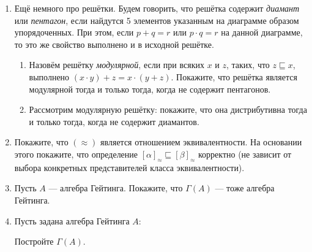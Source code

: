 \documentclass[10pt,a4paper,oneside]{article}
\begin{document}
\begin{enumerate}
\item Ещё немного про решётки. Будем говорить, что решётка содержит \emph{диамант} или \emph{пентагон},
если найдутся 5 элементов указанным на диаграмме образом упорядоченных.
При этом, если $p + q = r$ или $p \cdot q = r$ на данной диаграмме, то это же свойство выполнено 
и в исходной решётке.

\begin{center}\end{center}
\begin{enumerate}

\item Назовём решётку \emph{модулярной}, если при всяких $x$ и $z$, таких, что $z \sqsubseteq x$,
выполнено $(x \cdot y) + z = x \cdot (y + z)$. Покажите, что решётка является модулярной
тогда и только тогда, когда не содержит пентагонов.

\item Рассмотрим модулярную решётку: покажите, что она дистрибутивна тогда и только тогда,
когда не содержит диамантов.
\end{enumerate}

\item Покажите, что $(\approx)$ является отношением эквивалентности.
На основании этого покажите, что определение $[\alpha]_\approx \sqsubseteq [\beta]_\approx$ корректно
(не зависит от выбора конкретных представителей класса эквивалентности).

\item Пусть $A$ --- алгебра Гейтинга. Покажите, что $\Gamma(A)$ --- тоже алгебра Гейтинга.

\item Пусть задана алгебра Гейтинга $A$:
\begin{center}\end{center}
Постройте $\Gamma(A)$.


\end{enumerate}
\end{document}
